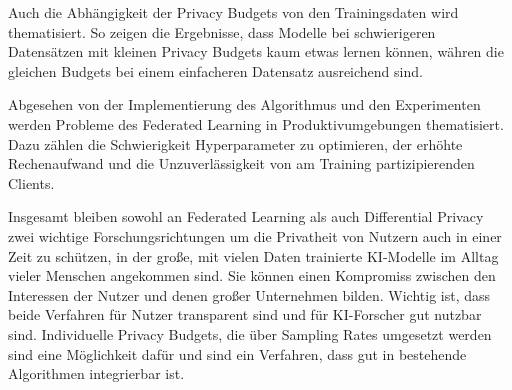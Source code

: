 Auch die Abhängigkeit der Privacy Budgets von den Trainingsdaten wird thematisiert. So zeigen die Ergebnisse, dass Modelle bei schwierigeren Datensätzen mit kleinen Privacy Budgets kaum etwas lernen können, währen die gleichen Budgets bei einem einfacheren Datensatz ausreichend sind.

Abgesehen von der Implementierung des Algorithmus und den Experimenten werden Probleme des Federated Learning in Produktivumgebungen thematisiert. Dazu zählen die Schwierigkeit Hyperparameter zu optimieren, der erhöhte Rechenaufwand und die Unzuverlässigkeit von am Training partizipierenden Clients.

Insgesamt bleiben sowohl an Federated Learning als auch Differential Privacy zwei wichtige Forschungsrichtungen um die Privatheit von Nutzern auch in einer Zeit zu schützen, in der große, mit vielen Daten trainierte KI-Modelle im Alltag vieler Menschen angekommen sind. Sie können einen Kompromiss zwischen den Interessen der Nutzer und denen großer Unternehmen bilden. Wichtig ist, dass beide Verfahren für Nutzer transparent sind und für KI-Forscher gut nutzbar sind. Individuelle Privacy Budgets, die über Sampling Rates umgesetzt werden sind eine Möglichkeit dafür und sind ein Verfahren, dass gut in bestehende Algorithmen integrierbar ist.